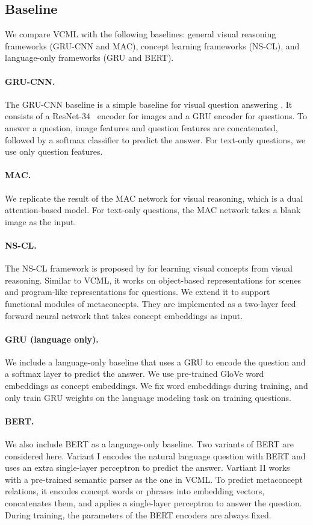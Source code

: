 \documentclass{article}
\newcommand{\model}{VCML\xspace}
\newcommand{\myparagraph}[1]{\vspace{-10pt}\paragraph{#1}}
\begin{document}
\vspace{-0.3em}
\subsection{Baseline}
\label{sec:exp:baseline}
\vspace{-0.3em}
We compare \model with the following baselines: general visual reasoning frameworks (GRU-CNN and MAC), concept learning frameworks (NS-CL), and language-only frameworks (GRU and BERT).

\myparagraph{GRU-CNN.} The GRU-CNN baseline is a simple baseline for visual question answering \citep{Zhou2015Simple}. It consists of a ResNet-34~\citep{He2015Deep} encoder for images and a GRU \citep{Cho2014Learning} encoder for questions. To answer a question, image features and question features are concatenated, followed by a softmax classifier to predict the answer. For text-only questions, we use only question features.
\myparagraph{MAC.} We replicate the result of the MAC network \citep{Hudson2018Compositional} for visual reasoning, which is a dual attention-based model. For text-only questions, the MAC network takes a blank image as the input.
\myparagraph{NS-CL.} The NS-CL framework is proposed by \cite{Mao2019NeuroSymbolic} for learning visual concepts from visual reasoning. Similar to \model, it works on object-based representations for scenes and program-like representations for questions. We extend it to support functional modules of metaconcepts. They are implemented as a two-layer feed forward neural network that takes concept embeddings as input.
\myparagraph{GRU (language only).} We include a language-only baseline that uses a GRU \citep{Cho2014Learning} to encode the question and a softmax layer to predict the answer. We use pre-trained GloVe \citep{pennington2014glove} word embeddings as concept embeddings. We fix word embeddings during training, and only train GRU weights on the language modeling task on training questions.
\myparagraph{BERT.} We also include BERT \citep{Jacob2018bert} as a language-only baseline. Two variants of BERT are considered here. Variant I encodes the natural language question with BERT and uses an extra single-layer perceptron to predict the answer.  Vartiant II works with a pre-trained semantic parser as the one in \model. To predict metaconcept relations, it encodes concept words or phrases into embedding vectors, concatenates them, and applies a single-layer perceptron to answer the question. During training, the parameters of the BERT encoders are always fixed.
\end{document}
